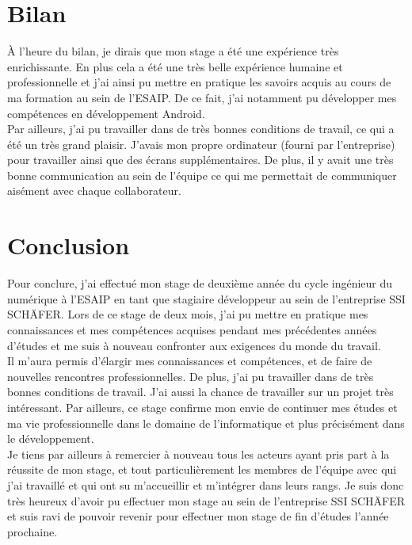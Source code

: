 \documentclass[a4paper, 12pt, french]{article}
\begin{document}
	\newpage

	\section{Bilan}
		À l'heure du bilan, je dirais que mon stage a été une expérience très enrichissante. En plus cela a été une très belle expérience humaine et professionnelle et j'ai ainsi pu mettre en pratique les savoirs acquis au cours de ma formation au sein de l'ESAIP. De ce fait, j'ai notamment pu développer mes compétences en développement Android.\\

	Par ailleurs, j'ai pu travailler dans de très bonnes conditions de travail, ce qui a été un très grand plaisir. J'avais mon propre ordinateur (fourni par l'entreprise) pour travailler ainsi que des écrans supplémentaires. De plus, il y avait une très bonne communication au sein de l'équipe ce qui me permettait de communiquer aisément avec chaque collaborateur.

	\newpage
	
	\section*{Conclusion}
	Pour conclure, j'ai effectué mon stage de deuxième année du cycle ingénieur du numérique à l'ESAIP en tant que stagiaire développeur au sein de l'entreprise SSI SCHÄFER. Lors de ce stage de deux mois, j'ai pu mettre en pratique mes connaissances et mes compétences acquises pendant mes précédentes années d’études et me suis à nouveau confronter aux exigences du monde du travail.\\


	Il m’aura permis d’élargir mes connaissances et compétences, et de faire de nouvelles rencontres professionnelles. De plus, j’ai pu travailler dans de très bonnes conditions de travail. J’ai aussi la chance de travailler sur un projet très intéressant. Par ailleurs, ce stage confirme mon envie de continuer mes études et ma vie professionnelle dans le domaine de l’informatique et plus précisément dans le développement.\\

	Je tiens par ailleurs à remercier à nouveau tous les acteurs ayant pris part à la réussite de mon stage, et tout particulièrement les membres de l’équipe avec qui j’ai travaillé et qui ont su m’accueillir et m’intégrer dans leurs rangs. Je suis donc très heureux d’avoir pu effectuer mon stage au sein de l'entreprise SSI SCHÄFER et suis ravi de pouvoir revenir pour effectuer mon stage de fin d'études l'année prochaine.
   
\end{document}
